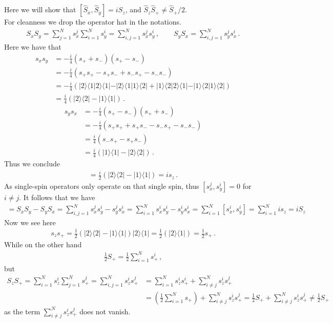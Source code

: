 \documentclass[11pt, oneside]{book}
\theoremstyle{break}
\theoremstyle{break}
\begin{document}
\chapter{}
Here we will show that $[\hat{S}_x, \hat{S}_y] = i \hat{S}_z$, and $\hat{S}_z \hat{S}_+ \neq \hat{S}_+/2$. \\
For cleanness we drop the operator hat in the notations. 
\begin{align*}
S_xS_y = \sum_{j=1}^N s_x^j \sum_{i=1}^N s_y^i = \sum_{i,j = 1}^N s_x^j s_y^i\,,\qquad 
S_y S_x = \sum_{i,j=1}^N s_y^j s_x^i\,.
\end{align*}
Here we have that 
\begin{align*}
s_x s_y &= -\frac{i}{4}\left( s_+ + s_-\right)(s_+ - s_-)  \\
&= -\frac{i}{4}(s_+s_+ - s_+s_- + s_-s_+ - s_-s_-)\\
&= -\frac{i}{4}(|2\rangle\langle 1|2\rangle\langle 1| - |2\rangle\langle 1| 1\rangle\langle 2| + |1\rangle\langle 2|2\rangle\langle 1| - |1\rangle\langle 2|1\rangle\langle 2| )\\
&= \frac{i}{4}\left( |2\rangle\langle 2| - |1\rangle\langle 1|\right)\,.
\end{align*}
\begin{align*}
s_y s_x &= -\frac{i}{4}(s_+ - s_-) \left( s_+ + s_-\right) \\
&= -\frac{i}{4}\left(s_+s_+ + s_+s_- - s_-s_+ -s_-s_- \right)\\
&= \frac{i}{4}\left( s_-s_+ - s_+s_-\right) \\
&= \frac{i}{4}\left(|1\rangle\langle 1| - |2\rangle\langle 2| \right)\,.
\end{align*}
Thus we conclude
\begin{align*}
[s_y,s_y] = \frac{i}{2}\left( |2\rangle\langle 2| - |1\rangle\langle 1|\right) = i s_z\,.
\end{align*}
As single-spin operators only operate on that single spin, thus $[s_x^j,s_y^i] = 0$ for $i \neq j$.  It follows that we have
\begin{align*}
[S_x,S_y] =S_x S_y - S_yS_x = \sum_{i,j=1}^N s_x^js_y^i- s_y^js_x^i = \sum_{i=1}^N s_x^is_y^i- s_y^is_x^i = \sum_{i=1}^N [s_x^i,s_y^i] = \sum_{i=1}^N is_z = iS_z
\end{align*}
Now we see here
\begin{align*}
s_zs_+ = \frac{1}{2}\left( |2\rangle\langle 2| - |1\rangle\langle 1| \right) | 2\rangle\langle 1| = \frac{1}{2}\left( |2\rangle\langle 1| \right) = \frac{1}{2}s_+\,.
\end{align*}
While on the other hand
\begin{align*}
\frac{1}{2} S_+ =\frac{1}{2} \sum_{i=1}^N s_+^i\,,
\end{align*}
but
\begin{align*}
S_zS_+ = \sum_{i=1}^N s_z^i \sum_{j=1}^N s_+^j = \sum_{i,j=1}^N s_z^is_+^j &= \sum_{i=1}^N s_z^i s_+^i + \sum_{i\neq j}^N s_z^is_+^j  \\
&=\left(\frac{1}{2} \sum_{i=1}^N s_+ \right)+ \sum_{i\neq j}^N s_z^is_+^j = \frac{1}{2}S_+ + \sum_{i\neq j}^N s_z^is_+^j \neq \frac{1}{2}S_+
\end{align*}
as the term $\sum_{i\neq j}^N s_z^is_+^j$ does not vanish. 
\end{document}
